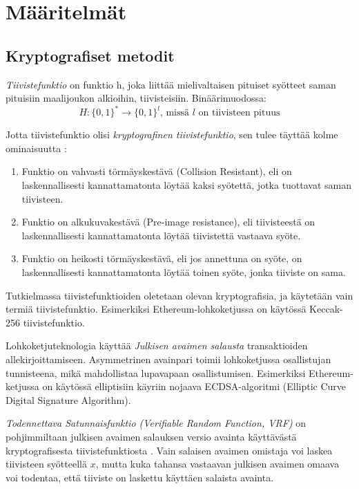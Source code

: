 \chapter{Määritelmät\label{methods}}

\section{Kryptografiset metodit}
\textit{Tiivistefunktio} on funktio h, joka liittää mielivaltaisen pituiset syötteet saman pituisiin maalijoukon alkioihin, tiivisteisiin. Binäärimuodossa: 
\begin{equation}
    H : \{0, 1\}^* \longrightarrow  \{0, 1\}^l \text{, missä $l$ on tiivisteen pituus}
\end{equation}

Jotta tiivistefunktio olisi \textit{kryptografinen tiivistefunktio}, sen tulee täyttää kolme ominaisuutta \cite{cryptoeprint:2011:565}: 
\begin{enumerate}
    \item Funktio on vahvasti törmäyskestävä (Collision Resistant), eli on laskennallisesti kannattamatonta löytää kaksi syötettä, jotka tuottavat saman tiivisteen.
    \item Funktio on alkukuvakestävä (Pre-image resistance), eli tiivisteestä on laskennallisesti kannattamatonta löytää tiivistettä vastaava syöte.
    \item Funktio on heikosti törmäyskestävä, eli jos annettuna on syöte, on laskennallisesti kannattamatonta löytää toinen syöte, jonka tiiviste on sama.
\end{enumerate}

Tutkielmassa tiivistefunktioiden oletetaan olevan kryptografisia, ja käytetään vain termiä tiivistefunktio. Esimerkiksi Ethereum-lohkoketjussa on käytössä Keccak-256 tiivistefunktio. 

 Lohkoketjuteknologia käyttää \textit{Julkisen avaimen salausta} transaktioiden allekirjoittamiseen. Asymmetrinen avainpari toimii lohkoketjussa osallistujan tunnisteena, mikä mahdollistaa lupavapaan osallistumisen. Esimerkiksi Ethereum-ketjussa on käytössä elliptisiin käyriin nojaava ECDSA-algoritmi (Elliptic Curve Digital Signature Algorithm). 

\textit{Todennettava Satunnaisfunktio (Verifiable Random Function, VRF)} \cite{micali_verifiable_1999} on pohjimmiltaan julkisen avaimen salauksen versio avainta käyttävästä kryptografisesta tiivistefunktiosta \cite{papadopoulos2017making}. Vain salaisen avaimen omistaja voi laskea tiivisteen syötteellä $x$, mutta kuka tahansa vastaavan julkisen avaimen omaava voi todentaa, että tiiviste on laskettu käyttäen salaista avainta.

